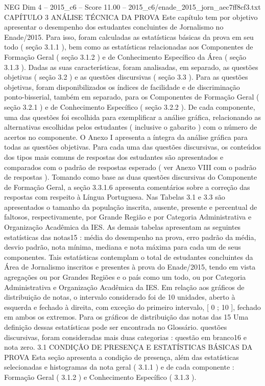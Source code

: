 \begin{textsample}{NEG Dim 4 – 2015\_c6 – Score 11.00 – 2015\_c6/enade\_2015\_jorn\_aec7ff8cf3.txt}  \label{ex:f4_neg_329}
CAPÍTULO 3 ANÁLISE TÉCNICA DA PROVA Este capítulo tem por objetivo apresentar o desempenho dos estudantes concluintes de Jornalismo no Enade/2015.
Para isso, foram calculadas as estatísticas básicas da prova em seu todo ( seção 3.1.1 ), bem como as estatísticas relacionadas aos Componentes de Formação Geral ( seção 3.1.2 ) e de Conhecimento Específico da Área ( seção 3.1.3 ).
Dadas as suas características, foram analisadas, em separado, as questões objetivas ( seção 3.2 ) e as questões discursivas ( seção 3.3 ).
Para as questões objetivas, foram disponibilizados os índices de facilidade e de discriminação ponto-bisserial, também em separado, para os Componentes de Formação Geral ( seção 3.2.1 ) e de Conhecimento Específico ( seção 3.2.2 ).
De cada componente, uma das questões foi escolhida para exemplificar a análise gráfica, relacionando as alternativas escolhidas pelos estudantes ( inclusive o gabarito ) com o número de acertos no componente.
O Anexo I apresenta a íntegra da análise gráfica para todas as questões objetivas.
Para cada uma das questões discursivas, os conteúdos dos tipos mais comuns de respostas dos estudantes são apresentados e comparados com o padrão de respostas esperado ( ver Anexo VIII com o padrão de respostas ).
Tomando como base as duas questões discursivas do Componente de Formação Geral, a seção 3.3.1.6 apresenta comentários sobre a correção das respostas com respeito à Língua Portuguesa.
Nas Tabelas 3.1 e 3.3 são apresentados o tamanho da população inscrita, ausente, presente e percentual de faltosos, respectivamente, por Grande Região e por Categoria Administrativa e Organização Acadêmica da IES.
As demais tabelas apresentam as seguintes estatísticas das notas15 : média do desempenho na prova, erro padrão da média, desvio padrão, nota mínima, mediana e nota máxima para cada um de seus componentes.
Tais estatísticas contemplam o total de estudantes concluintes da Área de Jornalismo inscritos e presentes à prova do Enade/2015, tendo em vista agregações ou por Grandes Regiões e o país como um todo, ou por Categoria Administrativa e Organização Acadêmica da IES.
Em relação aos gráficos de distribuição de notas, o intervalo considerado foi de 10 unidades, aberto à esquerda e fechado à direita, com exceção do primeiro intervalo, [ 0 ; 10 ], fechado em ambos os extremos.
Para os gráficos de distribuição das notas das 15 Uma definição dessas estatísticas pode ser encontrada no Glossário. questões discursivas, foram consideradas mais duas categorias : questão em branco16 e nota zero. 3.1 CONDIÇÃO DE PRESENÇA E ESTATÍSTICAS BÁSICAS DA PROVA Esta seção apresenta a condição de presença, além das estatísticas selecionadas e histogramas da nota geral ( 3.1.1 ) e de cada componente : Formação Geral ( 3.1.2 ) e Conhecimento Específico ( 3.1.3 ).

\end{textsample}
